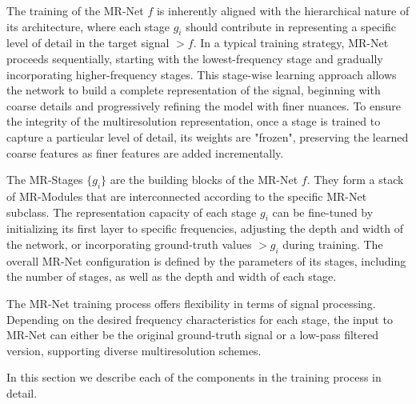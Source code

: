 The training of the MR-Net $f$ is inherently aligned with the hierarchical nature of its architecture, where each stage $g_i$ should contribute in representing a specific level of detail in the target signal $\gt{f}$. In a typical training strategy, MR-Net proceeds sequentially, starting with the lowest-frequency stage and gradually incorporating higher-frequency stages. This stage-wise learning approach allows the network to build a complete representation of the signal, beginning with coarse details and progressively refining the model with finer nuances. To ensure the integrity of the multiresolution representation, once a stage is trained to capture a particular level of detail, its weights are "frozen", preserving the learned coarse features as finer features are added incrementally.

The MR-Stages $\{g_i\}$ are the building blocks of the MR-Net $f$. They form a stack of MR-Modules that are interconnected according to the specific MR-Net subclass. The representation capacity of each stage $g_i$ can be fine-tuned by initializing its first layer to specific frequencies, adjusting the depth and width of the network, or incorporating ground-truth values $\gt{g}_i$ during training. The overall MR-Net configuration is defined by the parameters of its stages, including the number of stages, as well as the depth and width of each stage.


The MR-Net training process offers flexibility in terms of signal processing. Depending on the desired frequency characteristics for each stage, the input to MR-Net can either 
be the original ground-truth signal or a low-pass filtered version, supporting diverse multiresolution schemes.

In this section we describe each of the components in the training process in detail.





